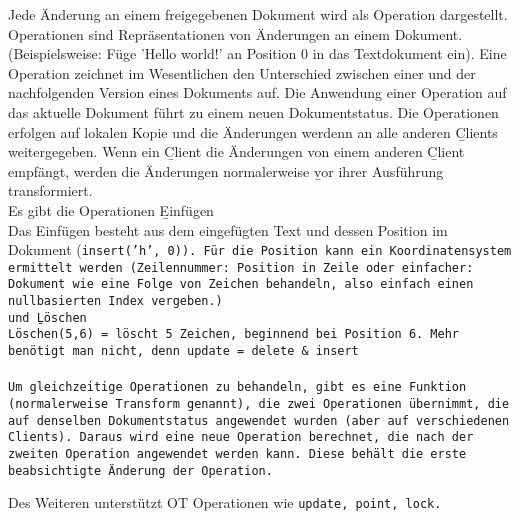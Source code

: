       Jede Änderung an einem freigegebenen Dokument wird als Operation dargestellt. Operationen sind Repräsentationen von Änderungen an einem Dokument. (Beispielsweise: Füge 'Hello world!' an Position 0 in das Textdokument ein).  Eine Operation zeichnet im Wesentlichen den Unterschied zwischen einer und der nachfolgenden Version eines Dokuments auf. Die Anwendung einer Operation auf das aktuelle Dokument führt zu einem neuen Dokumentstatus.
      Die Operationen erfolgen auf lokalen Kopie und die Änderungen werdenn an alle anderen \b{Clients} weitergegeben.  Wenn ein \b{Client} die Änderungen von einem anderen \b{Client} empfängt, werden die Änderungen normalerweise \b{vor} ihrer Ausführung transformiert.
      \\
      Es gibt die Operationen \b{Einfügen}\\
      Das Einfügen besteht aus dem eingefügten Text und dessen Position im Dokument (\tt{insert('h', 0)}).
      Für die Position kann ein Koordinatensystem ermittelt werden (Zeilennummer: Position in Zeile oder einfacher: Dokument wie eine Folge von Zeichen behandeln, also einfach einen nullbasierten Index vergeben.)\\
      und \b{Löschen}\\
      Löschen(5,6) = löscht 5 Zeichen, beginnend bei Position 6.
      Mehr benötigt man nicht, denn update = delete \& insert\\\\
      Um gleichzeitige Operationen zu behandeln, gibt es eine Funktion (normalerweise \texttt{Transform} genannt), die zwei Operationen übernimmt, die auf denselben Dokumentstatus angewendet wurden (aber auf verschiedenen Clients).
      Daraus wird eine neue Operation berechnet, die nach der zweiten Operation angewendet werden kann. Diese behält die erste beabsichtigte Änderung der Operation.

      Des Weiteren unterstützt \gls{OT} Operationen wie \tt{update}, \tt{point}, \tt{lock}.
